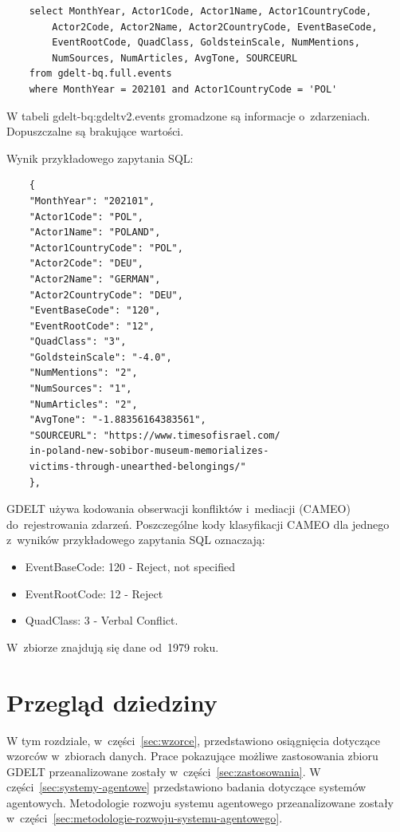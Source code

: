 \documentclass[11pt]{report}
\begin{document}
    \begin{verbatim}
    select MonthYear, Actor1Code, Actor1Name, Actor1CountryCode,
        Actor2Code, Actor2Name, Actor2CountryCode, EventBaseCode,
        EventRootCode, QuadClass, GoldsteinScale, NumMentions,
        NumSources, NumArticles, AvgTone, SOURCEURL
    from gdelt-bq.full.events
    where MonthYear = 202101 and Actor1CountryCode = 'POL'
    \end{verbatim}

    W tabeli gdelt-bq:gdeltv2.events gromadzone są informacje o~zdarzeniach.
    Dopuszczalne są brakujące wartości.

    Wynik przykładowego zapytania SQL:~\begin{verbatim}
    {
    "MonthYear": "202101",
    "Actor1Code": "POL",
    "Actor1Name": "POLAND",
    "Actor1CountryCode": "POL",
    "Actor2Code": "DEU",
    "Actor2Name": "GERMAN",
    "Actor2CountryCode": "DEU",
    "EventBaseCode": "120",
    "EventRootCode": "12",
    "QuadClass": "3",
    "GoldsteinScale": "-4.0",
    "NumMentions": "2",
    "NumSources": "1",
    "NumArticles": "2",
    "AvgTone": "-1.88356164383561",
    "SOURCEURL": "https://www.timesofisrael.com/
    in-poland-new-sobibor-museum-memorializes-
    victims-through-unearthed-belongings/"
    },
    \end{verbatim}

    GDELT używa kodowania obserwacji konfliktów i~mediacji (CAMEO) do~rejestrowania zdarzeń.
    Poszczególne kody klasyfikacji CAMEO dla jednego z~wyników przykładowego zapytania SQL oznaczają:
    \begin{itemize}
        \item EventBaseCode: 120 - Reject, not specified
        \item EventRootCode: 12 - Reject
        \item QuadClass: 3 - Verbal Conflict.
    \end{itemize}

    W~zbiorze znajdują się dane od~1979 roku.


    \chapter{Przegląd dziedziny}\label{ch:przegląd-dziedziny}
    W tym rozdziale, w~części~\ref{sec:wzorce}, przedstawiono osiągnięcia dotyczące wzorców w~zbiorach danych.
    Prace pokazujące możliwe zastosowania zbioru GDELT przeanalizowane zostały w~części~\ref{sec:zastosowania}.
    W części~\ref{sec:systemy-agentowe} przedstawiono badania dotyczące systemów agentowych.
    Metodologie rozwoju systemu agentowego przeanalizowane zostały w~części~\ref{sec:metodologie-rozwoju-systemu-agentowego}.
\end{document}
